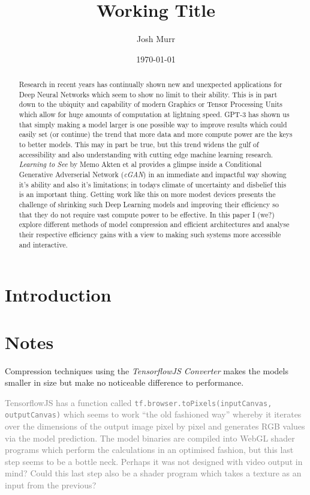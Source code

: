 \documentclass[a4paper]{article}
\title{Working Title}
\date{\today}
\author{Josh Murr}
\begin{document}
\maketitle

\begin{abstract}
	Research in recent years has continually shown new and unexpected applications for Deep Neural Networks which seem to show no limit to their ability. This is in part down to the ubiquity and capability of modern Graphics or Tensor Processing Units which allow for huge amounts of computation at lightning speed. GPT-3 has shown us that simply making a model larger is one possible way to improve results which could easily set (or continue) the trend that more data and more compute power are the keys to better models. This may in part be true, but this trend widens the gulf of accessibility and also understanding with cutting edge machine learning research. \textit{Learning to See} by Memo Akten et al provides a glimpse inside a Conditional Generative Adverserial Network (\textit{cGAN}) in an immediate and impactful way showing it's ability and also it's limitations; in todays climate of uncertainty and disbelief this is an important thing. Getting work like this on more modest devices presents the challenge of shrinking such Deep Learning models and improving their efficiency so that they do not require vast compute power to be effective. In this paper I (we?) explore different methods of model compression and efficient architectures and analyse their respective efficiency gains with a view to making such systems more accessible and interactive.
\end{abstract}

\section{Introduction}

\section{Notes}
Compression techniques using the \textit{TensorflowJS Converter} makes the models smaller in size but make no noticeable difference to performance.

\textcolor{Gray}{TensorflowJS has a function called \texttt{tf.browser.toPixels(inputCanvas, outputCanvas)} which seems to work ``the old fashioned way'' whereby it iterates over the dimensions of the output image pixel by pixel and generates RGB values via the model prediction. The model binaries are compiled into WebGL shader programs which perform the calculations in an optimised fashion, but this last step seems to be a bottle neck. Perhaps it was not designed with video output in mind? Could this last step also be a shader program which takes a texture as an input from the previous?}
\end{document}
